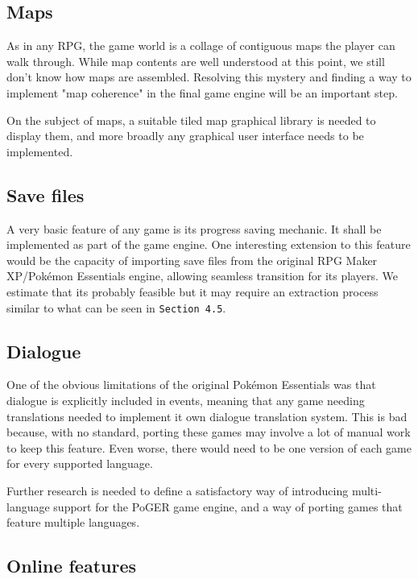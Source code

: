 \documentclass[11pt]{article}
\begin{document}
{\subsection{Maps}

As in any RPG, the game world is a collage of contiguous maps the player can walk through. While map contents are well understood at this point, we still don't know how maps are assembled. Resolving this mystery and finding a way to implement "map coherence" in the final game engine will be an important step.

On the subject of maps, a suitable tiled map graphical library is needed to display them, and more broadly any graphical user interface needs to be implemented.

\subsection{Save files}

A very basic feature of any game is its progress saving mechanic. It shall be implemented as part of the game engine. One interesting extension to this feature would be the capacity of importing save files from the original RPG Maker XP/Pokémon Essentials engine, allowing seamless transition for its players. We estimate that its probably feasible but it may require an extraction process similar to what can be seen in \texttt{Section 4.5}.


\subsection{Dialogue}

One of the obvious limitations of the original Pokémon Essentials was that dialogue is explicitly included in events, meaning that any game needing translations needed to implement it own dialogue translation system. This is bad because, with no standard, porting these games may involve a lot of manual work to keep this feature. Even worse, there would need to be one version of each game for every supported language.

Further research is needed to define a satisfactory way of introducing multi-language support for the PoGER game engine, and a way of porting games that feature multiple languages.


\subsection{Online features}

}
\end{document}

